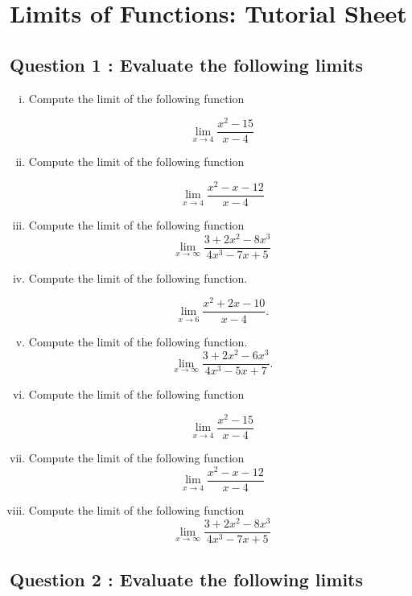 \documentclass[a4paper,12pt]{article}
\begin{document}
\section*{Limits of Functions: Tutorial Sheet}

\subsection*{Question 1 : Evaluate the following limits}
\begin{enumerate}[(i)]
	\item  Compute the limit of the following function
	
	\[\lim_{x \to 4 } \frac{x^2-15}{x-4}\]

	\item Compute the limit of the following function

	\[\lim_{x \to 4 } \frac{x^2-x-12}{x-4}\]

	\item  Compute the limit of the following function
	\[ \lim_{x \to \infty } \frac{3 + 2x^2 - 8x^3 }{4x^3 - 7x + 5} \]	
	

	\item  Compute the limit of the following function.
	
	\[\lim_{x \to 6 } \frac{x^2 + 2x-10}{x-4}.\]
	
	
	
	\item  Compute the limit of the following function.
	\[ \lim_{x \to \infty } \frac{3 + 2x^2 - 6x^3 }{4x^3 - 5x + 7}. \]	

	\item Compute the limit of the following function
	
	\[\lim_{x \to 4 } \frac{x^2-15}{x-4}\]
	\item  Compute the limit of the following function
	\[\lim_{x \to 4 } \frac{x^2-x-12}{x-4}\]
	\item Compute the limit of the following function
	\[ \lim_{x \to \infty } \frac{3 + 2x^2 - 8x^3 }{4x^3 - 7x + 5} \]	
	
\end{enumerate}

\newpage

\subsection*{Question 2 : Evaluate the following limits}
\end{document}
